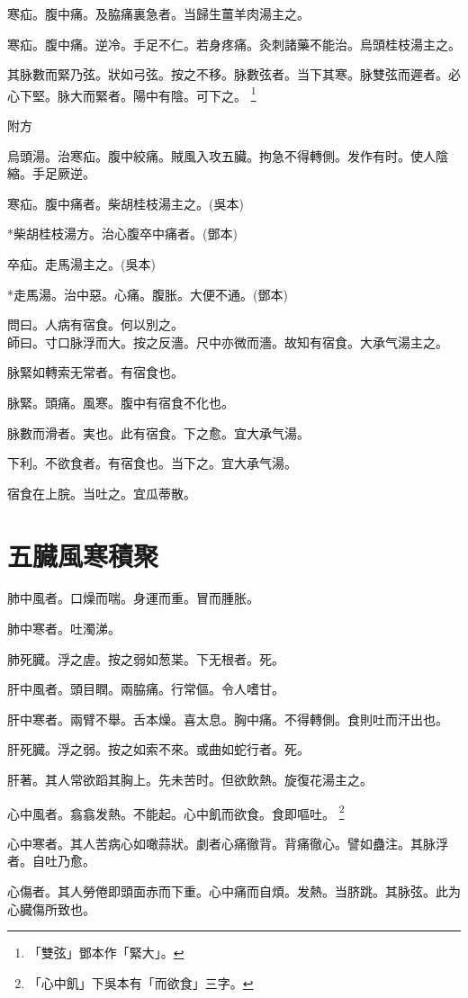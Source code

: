 \documentclass[12pt,twoside,UTF8,b5paper]{ctexbook}
\begin{document}
寒疝。腹中痛。及脇痛裏急者。当歸生薑羊肉湯主之。

寒疝。腹中痛。逆冷。手足不仁。若身疼痛。灸刺諸藥不能治。烏頭桂枝湯主之。

其脉數而緊乃弦。狀如弓弦。按之不移。脉數弦者。当下其寒。脉雙弦而遲者。必心下堅。脉大而緊者。陽中有陰。可下之。
	\footnote{「雙弦」鄧本作「緊大」。}

附方

烏頭湯。治寒疝。腹中絞痛。賊風入攻五臟。拘急不得轉側。发作有时。使人陰縮。手足厥逆。

寒疝。腹中痛者。柴胡桂枝湯主之。(吳本)

*柴胡桂枝湯方。治心腹卒中痛者。(鄧本)

卒疝。走馬湯主之。(吳本)

*走馬湯。治中惡。心痛。腹胀。大便不通。(鄧本)

問曰。人病有宿食。何以別之。\\
師曰。寸口脉浮而大。按之反濇。尺中亦微而濇。故知有宿食。大承气湯主之。

脉緊如轉索无常者。有宿食也。

脉緊。頭痛。風寒。腹中有宿食不化也。

脉數而滑者。実也。此有宿食。下之愈。宜大承气湯。

下利。不欲食者。有宿食也。当下之。宜大承气湯。

宿食在上脘。当吐之。宜瓜蒂散。

\chapter{五臓風寒積聚}

肺中風者。口燥而喘。身運而重。冒而腫胀。

肺中寒者。吐濁涕。

肺死臓。浮之虗。按之弱如葱枼。下无根者。死。

肝中風者。頭目瞤。兩脇痛。行常傴。令人嗜甘。

肝中寒者。兩臂不舉。舌本燥。喜太息。胸中痛。不得轉側。食則吐而汗出也。

肝死臓。浮之弱。按之如索不來。或曲如蛇行者。死。

肝著。其人常欲蹈其胸上。先未苦时。但欲飲熱。旋復花湯主之。

心中風者。翕翕发熱。不能起。心中飢{而欲食}。食即嘔吐。
	\footnote{「心中飢」下吳本有「而欲食」三字。}

心中寒者。其人苦病心如噉蒜狀。劇者心痛徹背。背痛徹心。譬如蠱注。其脉浮者。自吐乃愈。

心傷者。其人勞倦即頭面赤而下重。心中痛而自煩。发熱。当脐跳。其脉弦。此为心臓傷所致也。
\end{document}
